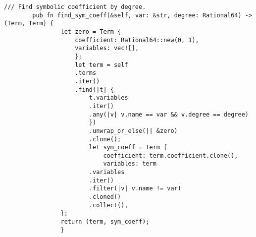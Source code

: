     \begin{lstlisting}[caption={The implementation of the \texttt{find\_sym\_coeff()} method for the \texttt{Polynomial} struct}, label={lst:polynomial-find-sym-coeff}]
        /// Find symbolic coefficient by degree.
        pub fn find_sym_coeff(&self, var: &str, degree: Rational64) -> (Term, Term) {
                let zero = Term {
                    coefficient: Rational64::new(0, 1),
                    variables: vec![],
                    };
                    let term = self
                    .terms
                    .iter()
                    .find(|t| {
                        t.variables
                        .iter()
                        .any(|v| v.name == var && v.degree == degree)
                        })
                        .unwrap_or_else(|| &zero)
                        .clone();
                        let sym_coeff = Term {
                            coefficient: term.coefficient.clone(),
                            variables: term
                        .variables
                        .iter()
                        .filter(|v| v.name != var)
                        .cloned()
                        .collect(),
                };
                return (term, sym_coeff);
                }
    \end{lstlisting}

